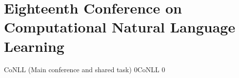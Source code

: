 \chapter[CoNLL: Thursday--Friday, June 26--27]{Eighteenth Conference on Computational Natural Language Learning}
\thispagestyle{emptyheader}
\vfill



\clearpage
\begin{wsschedule}
{CoNLL (Main conference and shared task)}
{0}{CoNLL}
{0}
{\CoNLLLoc}



\end{wsschedule}
